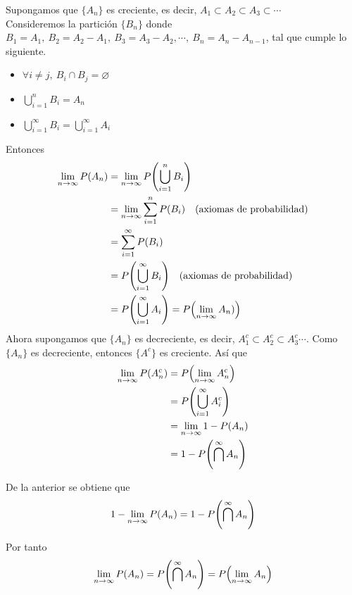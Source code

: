 \begin{myproof}
  Supongamos que $\{A_n\}$ es creciente, es decir, $A_1 \subset A_2 \subset A_3 \subset \cdots$\\
  Consideremos la partición $\{B_n\}$ donde $B_1 = A_1,~ B_2 = A_2 - A_1, ~ B_3 = A_3 - A_2, \cdots,~ B_n = A_n - A_{n-1}$, tal que cumple lo siguiente.
  \begin{itemize}
    \item $\forall i \neq j,~ B_i \cap B_j = \varnothing$
    \item $\bigcup_{i = 1}^n B_i = A_n$
    \item $\bigcup_{i = 1}^{\infty} B_i = \bigcup_{i = 1}^{\infty} A_i$
  \end{itemize}

  Entonces
  \begin{align*}
    \lim_{n \to \infty} P(A_n) &= \lim_{n \to \infty} P\parens*{\bigcup_{i = 1}^n B_i}\\
                               &= \lim_{n \to \infty} \sum_{i = 1}^n P(B_i) \quad \text{(axiomas de probabilidad)}\\
                               &= \sum_{i = 1}^{\infty} P(B_i)\\
                               &= P\parens*{\bigcup_{i = 1}^{\infty}B_i}
                               \quad \text{(axiomas de probabilidad)}\\ 
                               &= P\parens*{\bigcup_{i = 1}^{\infty}A_i}= P\parens*{\lim_{n \to \infty} A_n)}
  \end{align*}
  Ahora supongamos que $\{A_n\}$ es decreciente, es decir, $A_1^c \subset A_2^c \subset A_3^c \cdots$. Como $\{A_n\}$ es decreciente, entonces $\{A^c\}$ es creciente. Así que
  \begin{align*}
    \lim_{n \to \infty} P(A_n^c) &= P\parens*{\lim_{n \to \infty}A_n^c}\\
                        &= P\parens*{\bigcup_{i = 1}^{\infty}A_i^c}\\
                        &= \lim_{n \to \infty} 1 - P(A_n) \\
                        &= 1 - P\parens*{\bigcap^{\infty}A_n}\\
  \end{align*}

  De la anterior se obtiene que 
  \[1 - \lim_{n \to \infty} P(A_n) = 1 - P\parens*{\bigcap^{\infty}A_n}\]

  Por tanto
  \[\lim_{n \to \infty}P(A_n) = P\parens*{\bigcap^{\infty}A_n} = P\parens*{\lim_{n \to \infty}A_n}\]
\end{myproof}

